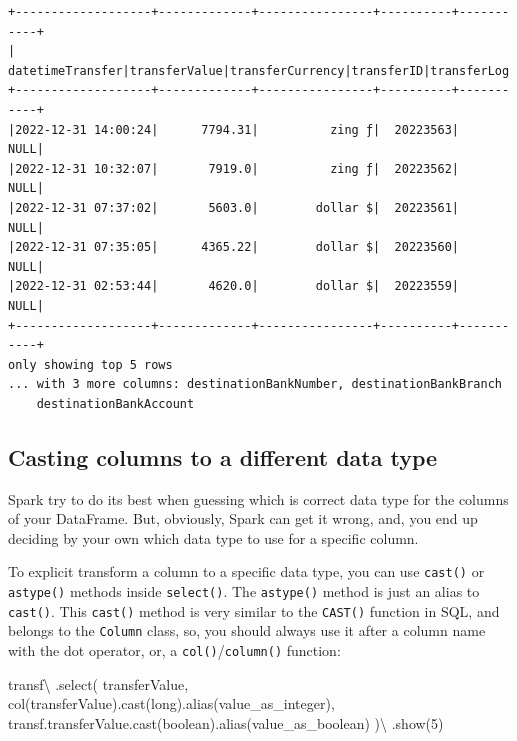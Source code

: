 \documentclass[
  11pt,
  letterpaper,
  DIV=11,
  numbers=noendperiod]{scrreprt}
\newenvironment{Shaded}{\begin{snugshade}}{\end{snugshade}}
\newcommand{\DecValTok}[1]{\textcolor[rgb]{0.68,0.00,0.00}{#1}}
\newcommand{\NormalTok}[1]{\textcolor[rgb]{0.00,0.23,0.31}{#1}}
\newcommand{\OperatorTok}[1]{\textcolor[rgb]{0.37,0.37,0.37}{#1}}
\newcommand{\StringTok}[1]{\textcolor[rgb]{0.13,0.47,0.30}{#1}}
\begin{document}
\begin{verbatim}
+-------------------+-------------+----------------+----------+-----------+
|   datetimeTransfer|transferValue|transferCurrency|transferID|transferLog|
+-------------------+-------------+----------------+----------+-----------+
|2022-12-31 14:00:24|      7794.31|          zing ƒ|  20223563|       NULL|
|2022-12-31 10:32:07|       7919.0|          zing ƒ|  20223562|       NULL|
|2022-12-31 07:37:02|       5603.0|        dollar $|  20223561|       NULL|
|2022-12-31 07:35:05|      4365.22|        dollar $|  20223560|       NULL|
|2022-12-31 02:53:44|       4620.0|        dollar $|  20223559|       NULL|
+-------------------+-------------+----------------+----------+-----------+
only showing top 5 rows
... with 3 more columns: destinationBankNumber, destinationBankBranch
    destinationBankAccount
\end{verbatim}

\hypertarget{sec-cast-column-type}{%
\subsection{Casting columns to a different data
type}\label{sec-cast-column-type}}

Spark try to do its best when guessing which is correct data type for
the columns of your DataFrame. But, obviously, Spark can get it wrong,
and, you end up deciding by your own which data type to use for a
specific column.

To explicit transform a column to a specific data type, you can use
\texttt{cast()} or \texttt{astype()} methods inside \texttt{select()}.
The \texttt{astype()} method is just an alias to \texttt{cast()}. This
\texttt{cast()} method is very similar to the \texttt{CAST()} function
in SQL, and belongs to the \texttt{Column} class, so, you should always
use it after a column name with the dot operator, or, a
\texttt{col()}/\texttt{column()} function:

\begin{Shaded}
\begin{Highlighting}[]
\NormalTok{transf}\OperatorTok{\textbackslash{}}
\NormalTok{  .select(}
    \StringTok{\textquotesingle{}transferValue\textquotesingle{}}\NormalTok{,}
\NormalTok{    col(}\StringTok{\textquotesingle{}transferValue\textquotesingle{}}\NormalTok{).cast(}\StringTok{\textquotesingle{}long\textquotesingle{}}\NormalTok{).alias(}\StringTok{\textquotesingle{}value\_as\_integer\textquotesingle{}}\NormalTok{),}
\NormalTok{    transf.transferValue.cast(}\StringTok{\textquotesingle{}boolean\textquotesingle{}}\NormalTok{).alias(}\StringTok{\textquotesingle{}value\_as\_boolean\textquotesingle{}}\NormalTok{)}
\NormalTok{  )}\OperatorTok{\textbackslash{}}
\NormalTok{  .show(}\DecValTok{5}\NormalTok{)}
\end{Highlighting}
\end{Shaded}
\end{document}
